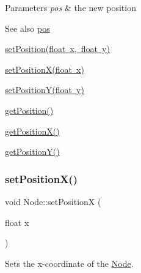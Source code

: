 \begin{DoxyParams}{Parameters}
{\em pos} & the new position \\
\hline
\end{DoxyParams}
\begin{DoxySeeAlso}{See also}
\mbox{\hyperlink{classsage_1_1Node_a7e0ae6eeb84fae60e54e6685c982b0b2}{pos}} 

\mbox{\hyperlink{classsage_1_1Node_aaa8545c103ef1b35e5076dbedab93af5}{set\+Position(float x, float y)}} 

\mbox{\hyperlink{classsage_1_1Node_ae1dfc73d6122a95778d5d9db3d1fd913}{set\+Position\+X(float x)}} 

\mbox{\hyperlink{classsage_1_1Node_a5c97d36655f0daa71a5f6c715d2b0470}{set\+Position\+Y(float y)}} 

\mbox{\hyperlink{classsage_1_1Node_a67eb5862f4da3cc4b2219a7e555a5678}{get\+Position()}} 

\mbox{\hyperlink{classsage_1_1Node_a17e92da5beaeb4b299c4e93729a22b1a}{get\+Position\+X()}} 

\mbox{\hyperlink{classsage_1_1Node_a26337a40b7da400233451b71e85759cc}{get\+Position\+Y()}} 
\end{DoxySeeAlso}
\mbox{\label{classsage_1_1Node_ae1dfc73d6122a95778d5d9db3d1fd913}} 
\subsubsection{\texorpdfstring{setPositionX()}{setPositionX()}}
{\footnotesize\ttfamily void Node\+::set\+PositionX (\begin{DoxyParamCaption}\item[{float}]{x }\end{DoxyParamCaption})}



Sets the x-\/coordinate of the \mbox{\hyperlink{classsage_1_1Node}{Node}}. 


